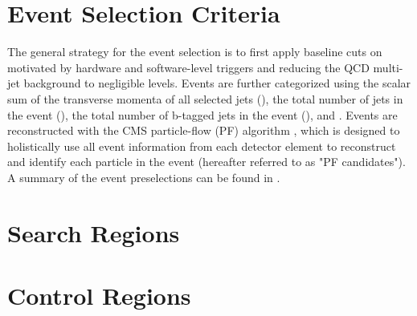 \section{Event Selection Criteria}
\label{sec:eventSelection}
The general strategy for the event selection is to first apply baseline cuts on motivated by hardware and software-level triggers  and reducing the QCD multi-jet background to negligible levels. Events are further categorized using the scalar sum of the transverse momenta \pt of all selected jets (\HT), the total number of jets in the event (\nj), the total number of b-tagged jets in the event (\nb), and \mttwo. Events are reconstructed with the CMS particle-flow (PF) algorithm , which is designed to holistically use all event information from each detector element to reconstruct and identify each particle in the event (hereafter referred to as "PF candidates"). A summary of the event preselections can be found in .

\section{Search Regions}

\section{Control Regions}


